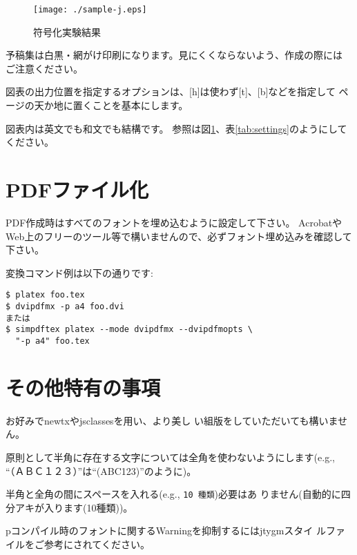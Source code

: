 \documentclass[10pt]{jarticle}
\begin{document}
\begin{figure}[tb]
\centering
\texttt{[image: ./sample-j.eps]}\\
\caption{符号化実験結果}
\label{fig:results}
\end{figure}


予稿集は白黒・網がけ印刷になります。見にくくならないよう、作成の際には
ご注意ください。

図表の出力位置を指定するオプションは、[h]は使わず[t]、[b]などを指定して
ページの天か地に置くことを基本にします。

図表内は英文でも和文でも結構です。
参照は図\ref{fig:results}、表\ref{tab:settings}のようにしてください。

\vspace{5cm}

\section{PDFファイル化}
PDF作成時はすべてのフォントを埋め込むように設定して下さい。
AcrobatやWeb上のフリーのツール等で構いませんので、必ずフォント埋め込みを確認して下さい。

変換コマンド例は以下の通りです:
\begin{verbatim}
$ platex foo.tex
$ dvipdfmx -p a4 foo.dvi
または
$ simpdftex platex --mode dvipdfmx --dvipdfmopts \
  "-p a4" foo.tex
\end{verbatim}


\section{その他\LaTeXe 特有の事項}

お好みでnewtx\cite{newtx}やjsclasses\cite{jsclasses}を用い、より美し
い組版をしていただいても構いません。



原則として半角に存在する文字については全角を使わないようにします(e.g., 
``（ＡＢＣ１２３）''は``(ABC123)''のように)。

半角と全角の間にスペースを入れる(e.g., \verb*|10 種類|)必要はあ
りません(自動的に四分アキが入ります(10種類))。

p\LaTeXe コンパイル時のフォントに関するWarningを抑制するにはjtygmスタイ
ルファイル\cite{jtygm}をご参考にされてください。
\end{document}
